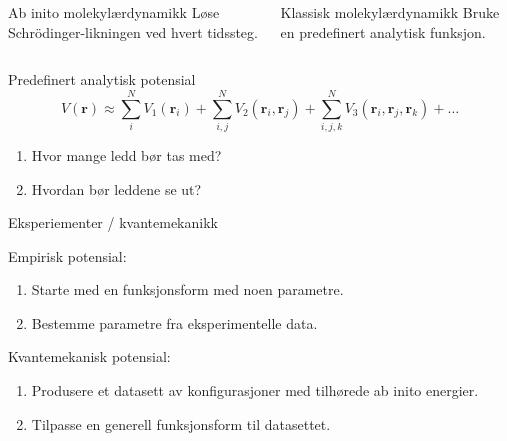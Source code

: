 \documentclass{beamer}
\begin{document}
\begin{frame}

\begin{columns}[T] %
  \begin{column}[T]{0.5\linewidth} %
    \begin{block}{Ab inito molekylærdynamikk}
    Løse Schrödinger-likningen ved hvert tidssteg.
    \end{block}
  \end{column}
  \begin{column}[T]{0.5\linewidth} %
    \begin{block}{Klassisk molekylærdynamikk}
    Bruke en predefinert analytisk funksjon.
    \end{block}
  \end{column}
\end{columns}

\end{frame}


\begin{frame}

\begin{block}{Predefinert analytisk potensial}
  \begin{equation*}
  V(\mathbf{r}) \approx \sum_i^N V_1(\mathbf{r}_i) + \sum_{i,j}^N V_2(\mathbf{r}_i, \mathbf{r}_j) + 
  \sum_{i,j,k}^N V_3(\mathbf{r}_i, \mathbf{r}_j, \mathbf{r}_k) + \dots
  \end{equation*}
\end{block}

\begin{enumerate}
 \item Hvor mange ledd bør tas med?
 \item Hvordan bør leddene se ut?
\end{enumerate}

Eksperiementer / kvantemekanikk

\end{frame}


\begin{frame}

\begin{block}{Empirisk potensial:}
 \begin{enumerate}
  \item Starte med en funksjonsform med noen parametre.
  \item Bestemme parametre fra eksperimentelle data.
 \end{enumerate}
\end{block}

\begin{block}{Kvantemekanisk potensial:}
 \begin{enumerate}
  \item Produsere et datasett av konfigurasjoner med tilhørede ab inito energier. 
  \item Tilpasse en generell funksjonsform til datasettet.
 \end{enumerate}
\end{block}

\end{frame}
\end{document}
